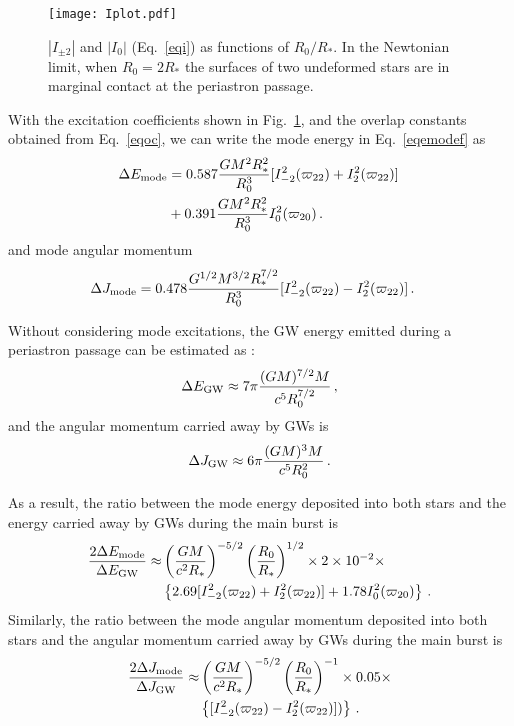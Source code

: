 \documentclass[prd,aps,floatfix,superscriptaddress,nofootinbib,twocolumn,10pt,English]{revtex4}
\begin{document}
\begin{figure}[tb]
\texttt{[image: Iplot.pdf]}
\caption{$|I_{\pm 2}|$ and $|I_{0}|$ (Eq.~\eqref{eqi}) as  functions of $R_0/R_*$. In the
Newtonian limit, when $R_0 = 2 R_*$ the surfaces of two undeformed stars are in
marginal contact at the periastron passage. 
}
\label{fig:Iplot}
\end{figure}


With the excitation coefficients shown in Fig.~\ref{fig:Iplot}, and the overlap constants obtained from  Eq.~\eqref{eqoc}, we can write the mode energy in Eq.~\eqref{eqemodef} as
\begin{align}\label{eqemodefn}
 \Delta E_{\rm mode} & =  0.587\frac{G M^2 R^2_*}{R^3_0}[I^2_{-2}(\varpi_{22})+I^2_{2}(\varpi_{22})]\,\nonumber \\
 &+ 0.391\frac{G M^2 R_*^2}{R^3_0} I^2_{0}(\varpi_{20})\,.
   \end{align} 
and mode angular momentum
\begin{align}\label{eqjmodefn}
 \Delta J_{\rm mode} & =  0.478 \frac{G^{1/2} M^{3/2} R^{7/2}_*}{R^3_0}[I^2_{-2}(\varpi_{22})-I^2_{2}(\varpi_{22})]\,.
   \end{align} 
   
   
Without considering mode excitations, the GW energy emitted during a periastron passage can be estimated as \cite{peters1964gravitational,chirenti2016gravitational}:
\begin{align}
\Delta E_{\rm GW} \approx 7 \pi \frac{(G M)^{7/2} M}{c^5 R_0^{7/2}}\,,
\end{align}   
and the angular momentum carried away by GWs is 
\begin{align}
\Delta J_{\rm GW} \approx 6 \pi \frac{(G M)^{3} M}{c^5 R_0^{2}}\,.
\end{align}  
 
 As a result, the ratio between the mode energy deposited into both stars and the energy carried away by GWs during the main burst is
 \begin{align}\label{eqeratio}
 \frac{2\Delta E_{\rm mode}}{\Delta E_{\rm GW}} \approx &\left ( \frac{G M}{c^2 R_*}\right )^{-5/2} \left ( \frac{R_0}{R_*}\right )^{1/2} \times 2\times 10^{-2} \times \nonumber \\
 &\left \{ 2.69 [  I^2_{-2}(\varpi_{22})+ I^2_{2}(\varpi_{22})]+1.78 I^2_{0}(\varpi_{20})\right \}\,.
 \end{align}
Similarly, the ratio between the mode angular momentum deposited into both stars and the angular momentum carried away by GWs during the main burst is
 \begin{align}\label{eqjratio}
 \frac{2\Delta J_{\rm mode}}{\Delta J_{\rm GW}} \approx &\left ( \frac{G M}{c^2 R_*}\right )^{-5/2} \left ( \frac{R_0}{R_*}\right )^{-1} \times 0.05 \times \nonumber \\
 &\left \{ [  I^2_{-2}(\varpi_{22})- I^2_{2}(\varpi_{22})])\right \}\,.
 \end{align}
 
\end{document}
